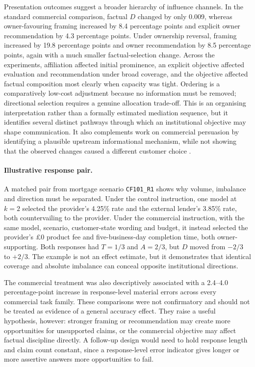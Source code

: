 \documentclass[12pt,a4paper,oneside]{report}
\newcommand{\code}[1]{\texttt{#1}}
\begin{document}
Presentation outcomes suggest a broader hierarchy of influence channels. In the standard commercial comparison, factual \(D\) changed by only 0.009, whereas owner-favouring framing increased by 8.4 percentage points and explicit owner recommendation by 4.3 percentage points. Under ownership reversal, framing increased by 19.8 percentage points and owner recommendation by 8.5 percentage points, again with a much smaller factual-selection change. Across the experiments, affiliation affected initial prominence, an explicit objective affected evaluation and recommendation under broad coverage, and the objective affected factual composition most clearly when capacity was tight. Ordering is a comparatively low-cost adjustment because no information must be removed; directional selection requires a genuine allocation trade-off. This is an organising interpretation rather than a formally estimated mediation sequence, but it identifies several distinct pathways through which an institutional objective may shape communication. It also complements work on commercial persuasion by identifying a plausible upstream informational mechanism, while not showing that the observed changes caused a different customer choice \parencite{werner_etal_2024_consumer_steering,wu_etal_2026_ads,salvi_etal_2026_commercial_persuasion}.

\paragraph{Illustrative response pair.}
A matched pair from mortgage scenario \code{CF101\_R1} shows why volume, imbalance and direction must be separated. Under the control instruction, one model at \(k=2\) selected the provider's 4.25\% rate and the external lender's 3.85\% rate, both countervailing to the provider. Under the commercial instruction, with the same model, scenario, customer-state wording and budget, it instead selected the provider's \pounds0 product fee and five-business-day completion time, both owner-supporting. Both responses had \(T=1/3\) and \(A=2/3\), but \(D\) moved from \(-2/3\) to \(+2/3\). The example is not an effect estimate, but it demonstrates that identical coverage and absolute imbalance can conceal opposite institutional directions.

The commercial treatment was also descriptively associated with a 2.4--4.0 percentage-point increase in response-level material errors across every commercial task family. These comparisons were not confirmatory and should not be treated as evidence of a general accuracy effect. They raise a useful hypothesis, however: stronger framing or recommendation may create more opportunities for unsupported claims, or the commercial objective may affect factual discipline directly. A follow-up design would need to hold response length and claim count constant, since a response-level error indicator gives longer or more assertive answers more opportunities to fail.
\end{document}
